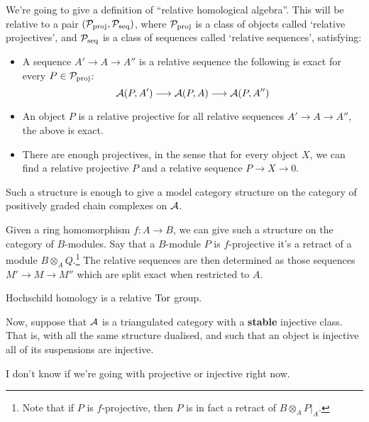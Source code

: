 \documentclass[11pt]{article}
\begin{document}
\begin{don't show}
We're going to give a definition of ``relative homological algebra''. This will be relative to a pair $(\mathcal{P}_{\textup{proj}},\mathcal{P}_{\textup{seq}})$, where $\mathcal{P}_{\textup{proj}}$ is a class of objects called `relative projectives', and $\mathcal{P}_{\textup{seq}}$ is a class of sequences called `relative sequences', satisfying:
\begin{itemize}\squishlist
\item A sequence $A'\to A\to A''$ is a relative sequence \Iff the following is exact for every $P\in\mathcal{P}_{\textup{proj}}$:
\[\mathcal{A}(P,A')\longrightarrow\mathcal{A}(P,A)\longrightarrow\mathcal{A}(P,A'')\]
\item An object $P$ is a relative projective \Iff for all relative sequences $A'\to A\to A''$, the above is exact.
\item There are enough projectives, in the sense that for every object $X$, we can find a relative projective $P$ and a relative sequence $P\to X\to0$.
\end{itemize}
Such a structure is enough to give a model category structure on the category of positively graded chain complexes on $\mathcal{A}$.

\begin{exmp*}
Given a ring homomorphism $f:A\to B$, we can give such a structure on the category of $B$-modules. Say that a $B$-module $P$ is $f$-projective \Iff it's a retract of a module $B\otimes_AQ$.\footnote{Note that if $P$ is $f$-projective, then $P$ is in fact a retract of $B\otimes_AP|_A$.} The relative sequences are then determined as those sequences $M'\to M\to M''$ which are split exact when restricted to $A$.
\end{exmp*}
\begin{exmp*}
Hochschild homology is a relative $\operatorname{Tor}$ group.
\end{exmp*}

Now, suppose that $\mathcal{A}$ is a triangulated category with a \textbf{stable} injective class. That is, with all the same structure dualised, and such that an object is injective \Iff all of its suspensions are injective.

\begin{shaded}
I don't know if we're going with projective or injective right now.
\end{shaded}


\end{don't show}
\end{document}
